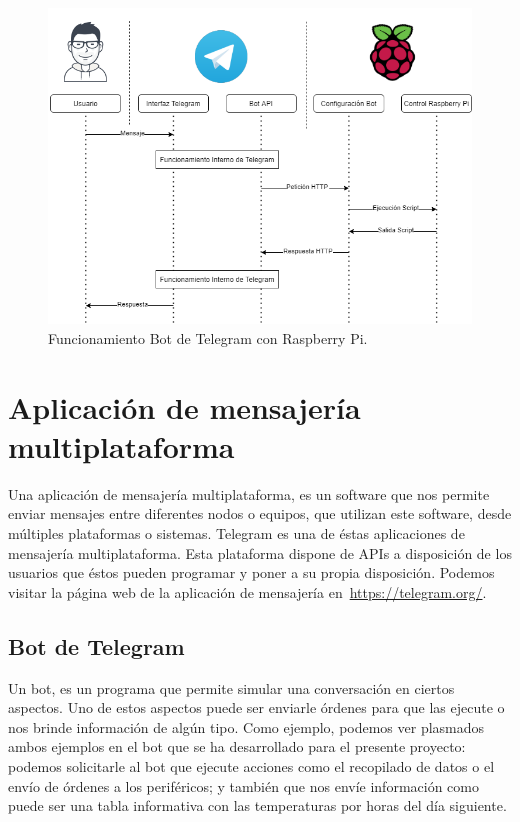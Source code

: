 \begin{figure}
    \centering
    \includegraphics[width=1.\textwidth]{img/Diagramas/FuncionamientoBot.png}
    \caption[Funcionamiento Bot]{Funcionamiento Bot de Telegram con Raspberry Pi.} \label{Img:3.FuncionamientoBot}
\end{figure}

\section{Aplicación de mensajería multiplataforma}\label{concepto:AppMensajería}
Una aplicación de mensajería multiplataforma, es un software que nos permite enviar mensajes entre diferentes nodos o equipos, que utilizan este software, desde múltiples plataformas o sistemas.
Telegram es una de éstas aplicaciones de mensajería multiplataforma. Esta plataforma dispone de APIs a disposición de los usuarios que éstos pueden programar y poner a su propia disposición.
Podemos visitar la página web de la aplicación de mensajería en~\url{https://telegram.org/}.

\subsection{Bot de Telegram}\label{concepto:botTelegram}
Un bot, es un programa que permite simular una conversación en ciertos aspectos. Uno de estos aspectos puede ser enviarle órdenes para que las ejecute o nos brinde información de algún tipo. Como ejemplo, podemos ver plasmados ambos ejemplos en el bot que se ha desarrollado para el presente proyecto: podemos solicitarle al bot que ejecute acciones como el recopilado de datos o el envío de órdenes a los periféricos; y también que nos envíe información como puede ser una tabla informativa con las temperaturas por horas del día siguiente.

